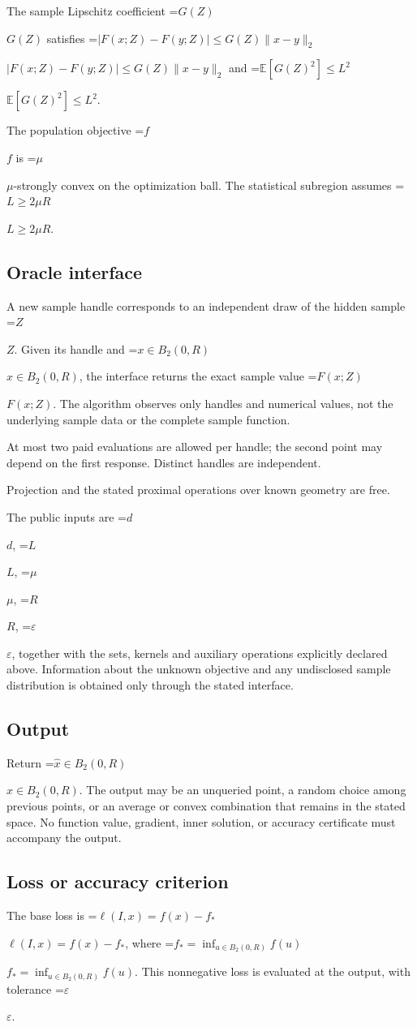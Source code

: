 \documentclass[10pt,a4paper]{article}
\newcommand{\AtlasMath}[1]{\par\begingroup\centering\setbox0=\hbox{$\displaystyle #1$}\ifdim\wd0>1.4\linewidth\typeout{ATLAS WIDE FORMULA: \the\wd0}\fi\ifdim\wd0>\linewidth\resizebox{\linewidth}{!}{\box0}\else\box0\fi\par\endgroup}
\newcommand{\AtlasInlineMath}[1]{\begingroup\setbox0=\hbox{$#1$}\ifdim\wd0>.4\linewidth\endgroup\AtlasMath{#1}\else\endgroup$#1$\fi}
\begin{document}
The sample Lipschitz coefficient \AtlasInlineMath{G(Z)} satisfies \AtlasInlineMath{|F(x;Z)-F(y;Z)|\le G(Z)\|x-y\|_2} and \AtlasInlineMath{\mathbb{E}[G(Z)^2]\le L^2}.

The population objective \AtlasInlineMath{f} is \AtlasInlineMath{\mu}-strongly convex on the optimization ball. The statistical subregion assumes \AtlasInlineMath{L\ge2\mu R}.

\subsection{Oracle interface}
A new sample handle corresponds to an independent draw of the hidden sample \AtlasInlineMath{Z}. Given its handle and \AtlasInlineMath{x\in B_2(0,R)}, the interface returns the exact sample value \AtlasInlineMath{F(x;Z)}. The algorithm observes only handles and numerical values, not the underlying sample data or the complete sample function.

At most two paid evaluations are allowed per handle; the second point may depend on the first response. Distinct handles are independent.

Projection and the stated proximal operations over known geometry are free.

The public inputs are \AtlasInlineMath{d}, \AtlasInlineMath{L}, \AtlasInlineMath{\mu}, \AtlasInlineMath{R}, \AtlasInlineMath{\varepsilon}, together with the sets, kernels and auxiliary operations explicitly declared above. Information about the unknown objective and any undisclosed sample distribution is obtained only through the stated interface.

\subsection{Output}
Return \AtlasInlineMath{\widehat{x}\in B_2(0,R)}. The output may be an unqueried point, a random choice among previous points, or an average or convex combination that remains in the stated space. No function value, gradient, inner solution, or accuracy certificate must accompany the output.

\subsection{Loss or accuracy criterion}
The base loss is \AtlasInlineMath{\ell(I,x)=f(x)-f_*}, where \AtlasInlineMath{f_*=\inf_{u\in B_2(0,R)}f(u)}. This nonnegative loss is evaluated at the output, with tolerance \AtlasInlineMath{\varepsilon}.
\end{document}
